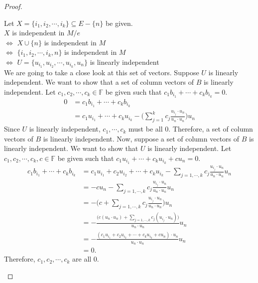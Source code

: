 \begin{proof}
\begin{enumerate}
  Let $X = \{ i_1, i_2, \cdots, i_k \} \subseteq E - \{ n \}$ be given. \\
  $X$ is independent in $M / e$ \\
  $\iff$ $X \cup \{ n \}$ is independent in $M$ \\
  $\iff$ $\{ i_1, i_2, \cdots, i_k, n \}$ is independent in $M$ \\
  $\iff$ $U = \{ u_{i_1}, u_{i_2}, \cdots, u_{i_k}, u_{n} \}$ is linearly independent \\
  We are going to take a close look at this set of vectors.
  Suppose $U$ is linearly independent.
  We want to show that a set of column vectors of $B$ is linearly independent.
  Let $c_1, c_2, \cdots, c_k \in \mathbb{F}$ be given such that $c_1 b_{i_1} + \cdots + c_k b_{i_k} = 0$.\\
  \begin{align*}\displaystyle 
  0 &= c_1 b_{i_1} + \cdots + c_k b_{i_k}  \\
    &= c_1 u_{i_1} + \cdots + c_k u_{i_k} - \Big( \sum_{j = 1}^{k} c_j \frac{u_{i_j} \cdot u_n}{u_n \cdot u_n} \Big) u_n
  \end{align*}
  Since $U$ is linearly independent, $c_1, \cdots, c_k$ must be all 0.
  Therefore, a set of column vectors of $B$ is linearly independent.
  Now, suppose a set of column vectors of $B$ is linearly independent.
  We want to show that $U$ is linearly independent.
  Let $c_1, c_2, \cdots, c_k, c \in \mathbb{F}$ be given such that $c_1 u_{i_1} + \cdots + c_k u_{i_k} + c u_n = 0$.\\
  \begin{align*}\displaystyle
  c_1 b_{i_1} + \cdots + c_k b_{i_k}
  &= c_1 u_{i_1} + c_2 u_{i_2} + \cdots + c_k u_{i_k} - \sum_{j=1,\cdots,k} c_j \frac{u_{i_j} \cdot u_n}{u_n \cdot u_n} u_n  \\
  &= -c u_n - \sum_{j=1,\cdots,k} c_j \frac{u_{i_j} \cdot u_n}{u_n \cdot u_n} u_n \\
  &= -\Big(c + \sum_{j=1,\cdots,k} c_j \frac{u_{i_j} \cdot u_n}{u_n \cdot u_n}\Big)u_n \\
  &= -\frac{\Big(c({u_n \cdot u_n}) + \sum_{j=1,\cdots,k} c_j (u_{i_j} \cdot u_n)\Big)}{u_n \cdot u_n}u_n \\
  &= -\frac{(c_1 u_{i_1} + c_2 u_{i_2} + \cdots + c_k u_{i_k} + c u_n) \cdot u_n}{u_n \cdot u_n}u_n \\
  &= 0.\end{align*}
  Therefore, $c_1, c_2, \cdots, c_k$ are all 0.

\end{enumerate}
\end{proof}
